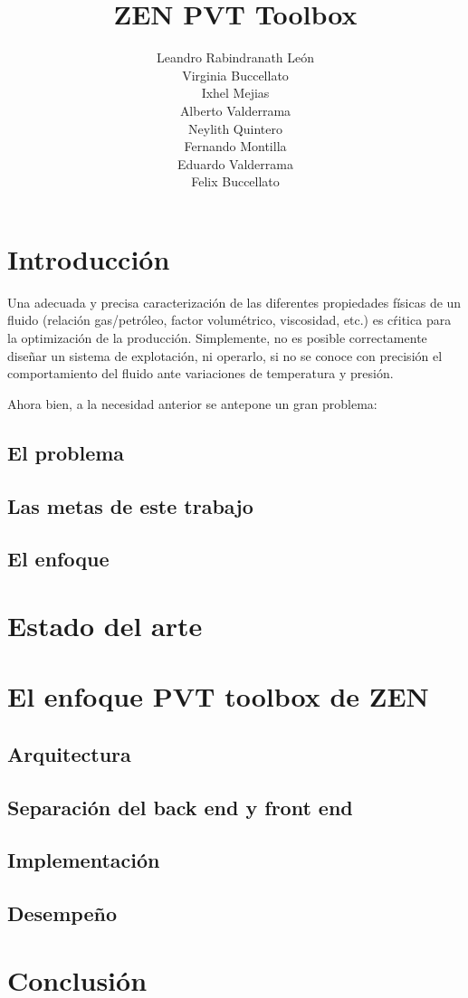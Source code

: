 \documentclass[9pt,conference]{IEEEtran}
\title{ZEN PVT Toolbox}
\author{Leandro Rabindranath León \\
       Virginia  Buccellato \\
       Ixhel Mejias \\
       Alberto Valderrama\\
       Neylith Quintero\\
       Fernando Montilla\\
       Eduardo Valderrama\\
       Felix Buccellato}
\begin{document}
\maketitle

 \section{Introducción}

 Una adecuada y precisa caracterización de las diferentes propiedades
 físicas de un fluido (relación gas/petróleo, factor volumétrico,
 viscosidad, etc.) es cŕitica para la optimización de la
 producción. Simplemente, no es posible correctamente diseñar un sistema
 de explotación, ni operarlo, si no se conoce con precisión el
 comportamiento del fluido ante variaciones de temperatura y presión.

 Ahora bien, a la necesidad anterior se antepone un gran problema: 

  \subsection{El problema}

  \subsection{Las metas de este trabajo}

  \subsection{El enfoque}

 \section{Estado del arte}

 \section{El enfoque PVT toolbox de ZEN}

  \subsection{Arquitectura}

  \subsection{Separación del back end y front end}

  \subsection{Implementación}

  \subsection{Desempeño}

 \section{Conclusión}
\end{document}
